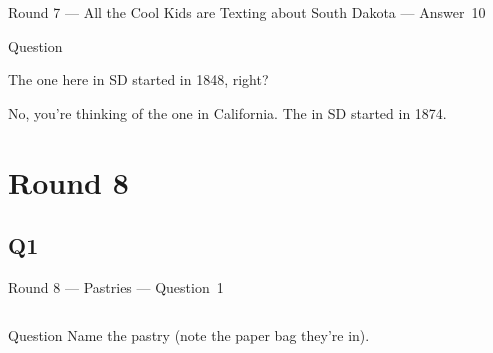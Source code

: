 \documentclass[11pt]{beamer}
\begin{document}
\begin{frame}[t]{Round 7 --- All the Cool Kids are Texting about South Dakota --- \mbox{Answer 10}}
\begin{block}{Question}

\begin{minipage}{0.9\textwidth}
\begin{mdframed}[
    roundcorner=7pt,
    backgroundcolor=black!5,
    linecolor=black!5,
    fontcolor=black,
    ignorelastdescenders]
\begin{flushleft}
{\small{}\selectfont{}
The one here in SD started in 1848, right?
}
\end{flushleft}
\end{mdframed}
\end{minipage}

\hfill{}\begin{minipage}{0.9\textwidth}
\begin{mdframed}[
    roundcorner=7pt,
    backgroundcolor=blue!80!white,
    linecolor=blue!80!white,
    fontcolor=white,
    ignorelastdescenders]
\begin{flushleft}
{\small{}\selectfont{}
No, you're thinking of the one in California.  The \textunderscore{}\textunderscore{}\textunderscore{}\textunderscore{}\textunderscore{}\textunderscore{} \textunderscore{}\textunderscore{}\textunderscore{}\textunderscore{}\textunderscore{}\textunderscore{} in SD started in 1874.
}
\end{flushleft}
\end{mdframed}
\end{minipage}
\end{block}
\end{frame}
\def\thisSectionName{Pastries}
\section{Round 8}
\subsection*{Q1}
\begin{frame}[t]{Round 8 --- Pastries --- \mbox{Question 1}}
\begin{columns}[T,totalwidth=\linewidth]
\begin{column}{0.32\linewidth}
\begin{block}{Question}
Name the pastry (note the paper bag they're in).
\end{block}
\end{column}
\begin{column}{0.65\linewidth}
\begin{center}
\texttt{[image: \{Images/zeppole]}.jpg}
\end{center}
\end{column}
\end{columns}
\end{frame}
\end{document}
